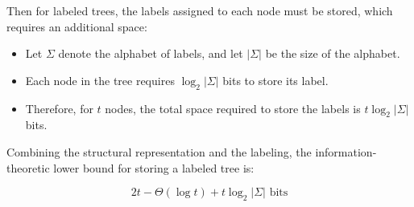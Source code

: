 Then for labeled trees, the labels assigned to each node must be stored, which requires an additional space:

\begin{itemize}
    \item Let $\Sigma$ denote the alphabet of labels, and let $|\Sigma|$ be the size of the alphabet.
    \item Each node in the tree requires $\log_2 |\Sigma|$ bits to store its label.
    \item Therefore, for $t$ nodes, the total space required to store the labels is $t \log_2 |\Sigma|$ bits.
\end{itemize}

Combining the structural representation and the labeling, the information-theoretic lower bound for storing a labeled tree is:

$$
    2t - \Theta(\log t) + t \log_2 |\Sigma| \text{ bits}
$$

